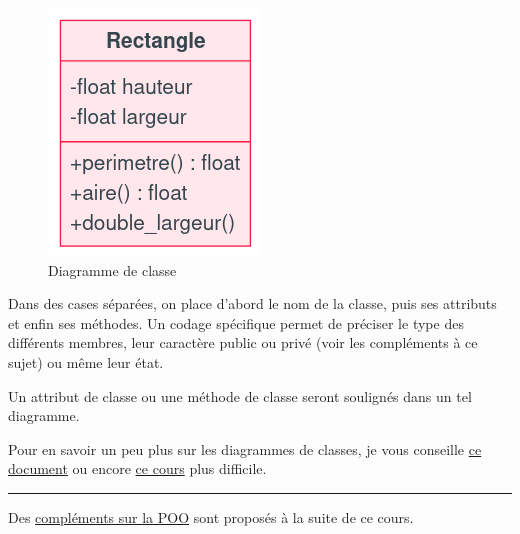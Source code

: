 \documentclass[
  a4paper,
  DIV=11,
  numbers=noendperiod]{scrartcl}
\begin{document}
\begin{figure}

{\centering \includegraphics{classe_mermaid.png}

}

\caption{Diagramme de classe}

\end{figure}

Dans des cases séparées, on place d'abord le nom de la classe, puis ses
attributs et enfin ses méthodes. Un codage spécifique permet de préciser
le type des différents membres, leur caractère public ou privé (voir les
compléments à ce sujet) ou même leur état.

Un attribut de classe ou une méthode de classe seront soulignés dans un
tel diagramme.

Pour en savoir un peu plus sur les diagrammes de classes, je vous
conseille
\href{https://inf1410.teluq.ca/teluqDownload.php?file=2014/01/INF1410_Guide_UML_DCC.pdf}{ce
document} ou encore
\href{https://laurent-audibert.developpez.com/Cours-UML/?page=diagramme-classes}{ce
cours} plus difficile.

\begin{center}\rule{0.5\linewidth}{0.5pt}\end{center}

Des \href{POO_complements.md}{compléments sur la POO} sont proposés à la
suite de ce cours.
\end{document}
